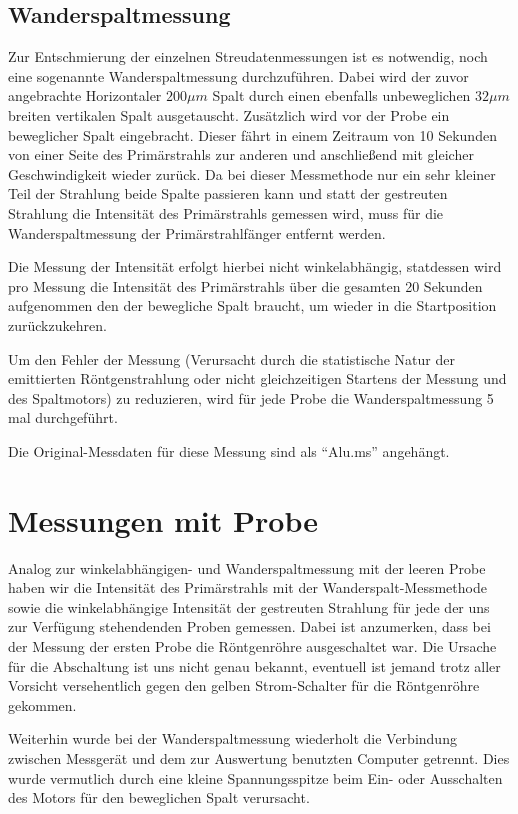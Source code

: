 \documentclass[bigchapter,colorback,accentcolor=tud4b,linedtoc,11pt]{tudreport}
\begin{document}
\subsection{Wanderspaltmessung}
Zur Entschmierung der einzelnen Streudatenmessungen ist es notwendig, noch eine sogenannte Wanderspaltmessung durchzuführen. Dabei wird der zuvor angebrachte Horizontaler $200\mu m$ Spalt durch einen ebenfalls unbeweglichen $32 \mu m$ breiten vertikalen Spalt ausgetauscht. Zusätzlich wird vor der Probe ein beweglicher Spalt eingebracht. Dieser fährt in einem Zeitraum von 10 Sekunden von einer Seite des Primärstrahls zur anderen und anschließend mit gleicher Geschwindigkeit wieder zurück. Da bei dieser Messmethode nur ein sehr kleiner Teil der Strahlung beide Spalte passieren kann und statt der gestreuten Strahlung die Intensität des Primärstrahls gemessen wird, muss für die Wanderspaltmessung der Primärstrahlfänger entfernt werden.

Die Messung der Intensität erfolgt hierbei nicht winkelabhängig, statdessen wird pro Messung die Intensität des Primärstrahls über die gesamten 20 Sekunden aufgenommen den der bewegliche Spalt braucht, um wieder in die Startposition zurückzukehren.

Um den Fehler der Messung (Verursacht durch die statistische Natur der emittierten Röntgenstrahlung oder nicht gleichzeitigen Startens der Messung und des Spaltmotors) zu reduzieren, wird für jede Probe die Wanderspaltmessung 5 mal durchgeführt.

Die Original-Messdaten für diese Messung sind als "`Alu.ms"' angehängt.

\section{Messungen mit Probe}
Analog zur winkelabhängigen- und Wanderspaltmessung mit der leeren Probe haben wir die Intensität des Primärstrahls mit der Wanderspalt-Messmethode sowie die winkelabhängige Intensität der gestreuten Strahlung für jede der uns zur Verfügung stehendenden Proben gemessen. Dabei ist anzumerken, dass bei der Messung der ersten Probe die Röntgenröhre ausgeschaltet war. Die Ursache für die Abschaltung ist uns nicht genau bekannt, eventuell ist jemand trotz aller Vorsicht versehentlich gegen den gelben Strom-Schalter für die Röntgenröhre gekommen.

Weiterhin wurde bei der Wanderspaltmessung wiederholt die Verbindung zwischen Messgerät und dem zur Auswertung benutzten Computer getrennt. Dies wurde vermutlich durch eine kleine Spannungsspitze beim Ein- oder Ausschalten des Motors für den beweglichen Spalt verursacht.
\end{document}
